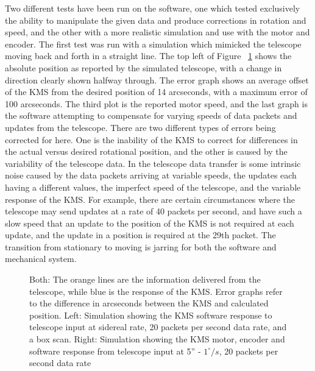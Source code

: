 \documentclass[manuscript]{aastex}
\begin{document}
Two different tests have been run on the software, one which tested exclusively the ability to manipulate the given data and produce corrections in rotation and speed, and the other with a more realistic simulation and use with the motor and encoder. The first test was run with a simulation which mimicked the telescope moving back and forth in a straight line. The top left of Figure ~\ref{fig:km78} shows the absolute position as reported by the simulated telescope, with a change in direction clearly shown halfway through. The error graph shows an average offset of the KMS from the desired position of 14 arcseconds, with a maximum error of 100 arcseconds. The third plot is the reported motor speed, and the last graph is the software attempting to compensate for varying speeds of data packets and updates from the telescope. There are two different types of errors being corrected for here. One is the inability of the KMS to correct for differences in the actual versus desired rotational position, and the other is caused by the variability of the telescope data. In the telescope data transfer is some intrinsic noise caused by the data packets arriving at variable speeds, the updates each having a different values, the imperfect speed of the telescope, and the variable response of the KMS. For example, there are certain circumstances where the telescope may send updates at a rate of 40 packets per second, and have such a slow speed that an update to the position of the KMS is not required at each update, and the update in a position is required at the 29th packet. The transition from stationary to moving is jarring for both the software and mechanical system. 

\begin{figure}[ht!]
	\centering
	\qquad
	\singlespace
	\caption[Telescope Simulation test of KMS Software and Motor]{Both: The orange lines are the information delivered from the telescope, while blue is the response of the KMS. Error graphs refer to the difference in arcseconds between the KMS and calculated position. Left: Simulation showing the KMS software response to telescope input at sidereal rate, 20 packets per second data rate, and a box scan. Right: Simulation showing the KMS motor, encoder and software response from telescope input at 5'' - $1^{\circ}/s$, 20 packets per second data rate}%
	\label{fig:km78}%
\end{figure}
\end{document}
